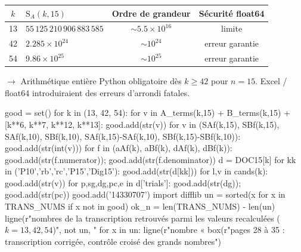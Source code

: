 \documentclass[11pt,a4paper]{article}
\newcommand{\SA}{\mathrm{S}_A}
\begin{document}
\begin{boitenote}
\begin{center}
\small
\begin{tabular}{@{}clcc@{}}
\toprule
\rowcolor{spectralgris}
$k$ & $\SA(k, 15)$ & \textbf{Ordre de grandeur} & \textbf{Sécurité float64} \\
\midrule
13 & $55\,125\,210\,906\,883\,585$ & $\sim 5.5 \times 10^{16}$ & limite \\
42 & $2.285 \times 10^{24}$ & $\sim 10^{24}$ & erreur garantie \\
54 & $9.86 \times 10^{25}$ & $\sim 10^{25}$ & erreur garantie \\
\bottomrule
\end{tabular}
\end{center}
\end{boitenote}


\vspace{0.3cm}

\begin{boitealerte}
$\rightarrow$ Arithmétique entière Python obligatoire dès $k \geq 42$ pour $n=15$. Excel / float64 introduiraient des erreurs d'arrondi fatales.
\end{boitealerte}

\vspace{0.5cm}

\begin{pycode}
good = set()
for k in (13, 42, 54):
    for v in A_terms(k,15) + B_terms(k,15) + [k**6, k**7, k**12, k**13]:
        good.add(str(v))
    for v in (SAf(k,15), SBf(k,15), SAf(k,10), SBf(k,10), SAf(k,15)-SAf(k,10), SBf(k,15)-SBf(k,10)):
        good.add(str(int(v)))
    for f in (aAf(k), aBf(k), dAf(k), dBf(k)):
        good.add(str(f.numerator)); good.add(str(f.denominator))
    d = DOC15[k]
    for kk in ('P10','rb','rc','P15','Dig15'):
        good.add(str(d[kk]))
    for l,v in cands(k):
        good.add(str(v))
    for p,sg,dg,pc,e in d['trials']:
        good.add(str(dg)); good.add(str(pc))
good.add('14330707')
import difflib
un = sorted(x for x in TRANS_NUMS if x not in good)
ok_n = len(TRANS_NUMS) - len(un)
ligne(r"nombres de la transcription retrouvés parmi les valeurs recalculées ($k=13,42,54$)", not un, "%
for x in un:
    ligne(r"nombre « %
box(r"pages 28 à 35 : transcription corrigée, contrôle croisé des grands nombres")
\end{pycode}
\end{document}
